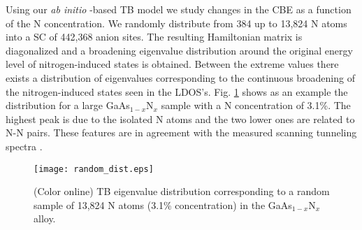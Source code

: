 \documentclass[aps,prb,10pt,twocolumn,groupedaddress]{revtex4-1}
\begin{document}
Using our \textit{ab initio} -based TB model we study changes 
in the CBE as a function of the N concentration. We randomly distribute from 
384 up to 13,824 N atoms into a SC of 442,368 anion sites. The resulting 
Hamiltonian matrix is diagonalized
and a broadening eigenvalue distribution around the original energy level of
nitrogen-induced states is obtained. Between the extreme values there exists a 
distribution of eigenvalues
corresponding to the continuous broadening of the nitrogen-induced states seen
in the 
LDOS's. Fig. \ref{fig:random_dist}  shows as an example the distribution for a
large GaAs$_{1-x}$N$_x$ sample with a N concentration of 3.1\%. The highest peak
is due to the isolated N atoms and the two lower ones are related to N-N pairs.
These features are in agreement with the measured scanning tunneling spectra
.\cite{ivanova}
\begin{figure}[!t]
  \centering
  \texttt{[image: random\_dist.eps]}
  \caption{(Color online) TB eigenvalue distribution 
corresponding to a random sample of 13,824 N atoms (3.1\% concentration)
in the GaAs$_{1-x}$N$_x$ alloy.}
  \label{fig:random_dist}
\end{figure} 
\end{document}
